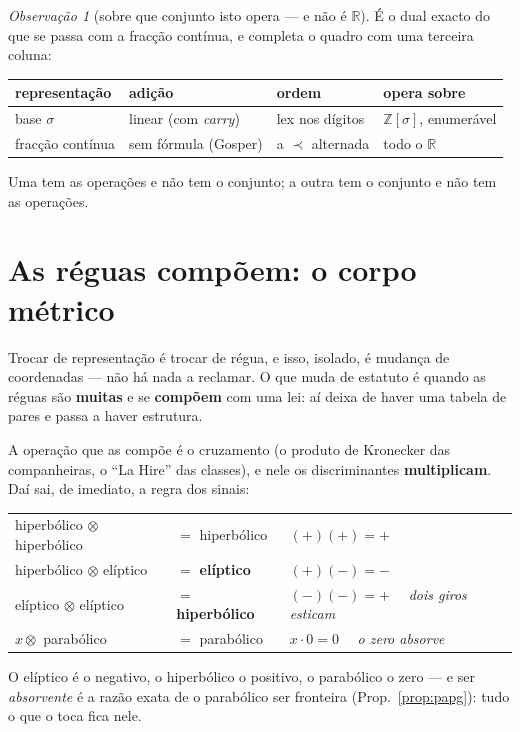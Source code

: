 \documentclass[11pt,a4paper]{article}
\theoremstyle{plain}
\theoremstyle{definition}
\theoremstyle{remark}
\newtheorem{obs}[teorema]{Observação}
\newcommand{\R}{\mathbb{R}}
\newcommand{\Z}{\mathbb{Z}}
\begin{document}
\begin{obs}[sobre que conjunto isto opera --- e não é $\R$]
É o dual exacto do que se passa com a fracção contínua, e completa o quadro com uma terceira coluna:

\begin{center}\small
\begin{tabular}{llll}
\hline
representação & adição & ordem & opera sobre \\ \hline
base $\sigma$ & linear (com \emph{carry}) & lex nos dígitos & $\Z[\sigma]$, enumerável \\
fracção contínua & sem fórmula (Gosper) & a $\prec$ alternada & todo o $\R$ \\
\hline
\end{tabular}
\end{center}

\noindent Uma tem as operações e não tem o conjunto; a outra tem o conjunto e não tem as operações.
\end{obs}


\section{As réguas compõem: o corpo métrico}\label{sec:metrico}

Trocar de representação é trocar de régua, e isso, isolado, é mudança de coordenadas --- não há
nada a reclamar. O que muda de estatuto é quando as réguas são \textbf{muitas} e se \textbf{compõem}
com uma lei: aí deixa de haver uma tabela de pares e passa a haver estrutura.

A operação que as compõe é o cruzamento (o produto de Kronecker das companheiras, o ``La Hire'' das
classes), e nele os discriminantes \textbf{multiplicam}. Daí sai, de imediato, a regra dos sinais:

\begin{center}\small
\begin{tabular}{lll}
\hline
hiperbólico $\otimes$ hiperbólico & $= $ hiperbólico & $(+)(+) = +$ \\
hiperbólico $\otimes$ elíptico & $= $ \textbf{elíptico} & $(+)(-) = -$ \\
elíptico $\otimes$ elíptico & $= $ \textbf{hiperbólico} & $(-)(-) = +$ \ \ \emph{dois giros esticam} \\
$x \otimes$ parabólico & $= $ parabólico & $x\cdot0 = 0$ \ \ \emph{o zero absorve} \\
\hline
\end{tabular}
\end{center}

\noindent O elíptico é o negativo, o hiperbólico o positivo, o parabólico o zero --- e ser
\emph{absorvente} é a razão exata de o parabólico ser fronteira (Prop.~\ref{prop:papg}): tudo o que
o toca fica nele.
\end{document}
